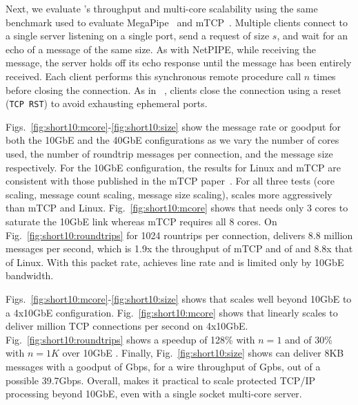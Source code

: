 Next, we evaluate \ix's throughput and multi-core scalability using
the same benchmark used to evaluate
MegaPipe~\cite{DBLP:conf/osdi/HanMCR12} and
mTCP~\cite{jeong2014mtcp}. Multiple clients connect to a single server
listening on a single port, send a request of size $s$, and wait for
an echo of a message of the same size.  As with NetPIPE, while
receiving the message, the server holds off its echo response until
the message has been entirely received.  Each client performs this
synchronous remote procedure call $n$ times before closing the
connection.  As in ~\cite{jeong2014mtcp}, clients close the connection
using a reset (\texttt{TCP RST}) to avoid exhausting ephemeral ports.



Figs.~\ref{fig:short10:mcore}-\ref{fig:short10:size} show the message
rate or goodput for both the 10GbE and the 40GbE configurations as we
vary the number of cores used, the number of roundtrip messages per
connection, and the message size respectively.  For the 10GbE
configuration, the results for Linux and mTCP are consistent with
those published in the mTCP paper~\cite{jeong2014mtcp}.  For all three
tests (core scaling, message count scaling, message size scaling), \ix
scales more aggressively than mTCP and
Linux. Fig.~\ref{fig:short10:mcore} shows that \ix needs only 3 cores
to saturate the 10GbE link whereas mTCP requires all 8 cores. On
Fig.~\ref{fig:short10:roundtrips} for 1024 rountrips per connection,
\ix delivers 8.8 million messages per second, which is
1.9x the throughput of mTCP and of and 8.8x that of
Linux. With this packet rate, \ix achieves line rate and is limited
only by 10GbE bandwidth.


Figs.~\ref{fig:short10:mcore}-\ref{fig:short10:size} shows that \ix
scales well beyond 10GbE to a 4x10GbE configuration.
Fig.~\ref{fig:short10:mcore} shows that \ix linearly scales to deliver
million TCP connections per second on 4x10GbE.
Fig.~\ref{fig:short10:roundtrips} shows a speedup of 128\% with $n=1$
and of 30\% with $n=1K$ over 10GbE \ix.  Finally,
Fig.~\ref{fig:short10:size} shows \ix can deliver 8KB messages with a
goodput of Gbps, for a wire throughput of
Gpbs, out of a possible 39.7Gbps.  Overall, \ix makes
it practical to scale protected TCP/IP processing beyond 10GbE, even
with a single socket multi-core server.

